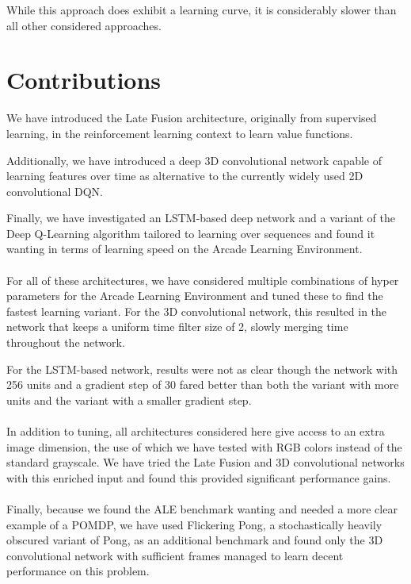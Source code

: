 While this approach does exhibit a learning curve,
it is considerably slower than all other considered approaches.

\section{Contributions}
\label{sec:contributions}
We have introduced the Late Fusion architecture,
originally from supervised learning,
in the reinforcement learning context
to learn value functions.

Additionally,
we have introduced a deep 3D convolutional network
capable of learning features over time
as alternative to the currently widely used 2D convolutional DQN.

Finally,
we have investigated an LSTM-based deep network
and a variant of the Deep Q-Learning algorithm
tailored to learning over sequences
and found it wanting in terms of learning speed
on the Arcade Learning Environment.

\paragraph{}
For all of these architectures,
we have considered multiple combinations of hyper parameters
for the Arcade Learning Environment
and tuned these to find the fastest learning variant.
For the 3D convolutional network,
this resulted in the network
that keeps a uniform time filter size of 2,
slowly merging time throughout the network.

For the LSTM-based network,
results were not as clear
though the network with 256 units and a gradient step of 30
fared better than both the variant with more units
and the variant with a smaller gradient step.

\paragraph{}
In addition to tuning,
all architectures considered here
give access to an extra image dimension,
the use of which we have tested with RGB colors
instead of the standard grayscale.
We have tried the Late Fusion
and 3D convolutional networks with this enriched input
and found this provided significant performance gains.

\paragraph{}
Finally,
because we found the ALE benchmark wanting
and needed a more clear example of a POMDP,
we have used Flickering Pong,
a stochastically heavily obscured variant of Pong,
as an additional benchmark
and found only
the 3D convolutional network
with sufficient frames
managed to learn decent performance
on this problem.


